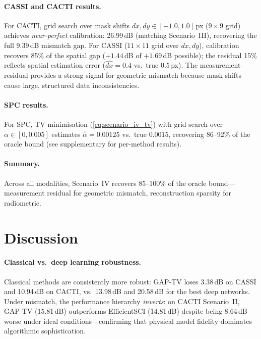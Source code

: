 \documentclass[runningheads]{llncs}
\begin{document}
\paragraph{CASSI and CACTI results.}
For CACTI, grid search over mask shifts $dx, dy \in [-1.0, 1.0]$\,px ($9 \times 9$ grid) achieves \emph{near-perfect} calibration: 26.99\,dB (matching Scenario~III), recovering the full 9.39\,dB mismatch gap.
For CASSI ($11 \times 11$ grid over $dx, dy$), calibration recovers 85\% of the spatial gap ($+1.44$\,dB of $+1.69$\,dB possible); the residual 15\% reflects spatial estimation error ($\hat{dx}{=}0.4$ vs.\ true $0.5$\,px).
The measurement residual provides a strong signal for geometric mismatch because mask shifts cause large, structured data inconsistencies.

\paragraph{SPC results.}
For SPC, TV minimisation (\cref{eq:scenario_iv_tv}) with grid search over $\alpha \in [0, 0.005]$ estimates $\hat{\alpha} = 0.00125$ vs.\ true $0.0015$, recovering 86--92\% of the oracle bound (see supplementary for per-method results).



\paragraph{Summary.}
Across all modalities, Scenario~IV recovers 85--100\% of the oracle bound---measurement residual for geometric mismatch, reconstruction sparsity for radiometric.

\section{Discussion}
\label{sec:discussion}

\paragraph{Classical vs.\ deep learning robustness.}
Classical methods are consistently more robust: GAP-TV loses 3.38\,dB on CASSI and 10.94\,dB on CACTI, vs.\ 13.98\,dB and 20.58\,dB for the best deep networks.
Under mismatch, the performance hierarchy \emph{inverts}: on CACTI Scenario~II, GAP-TV (15.81\,dB) outperforms EfficientSCI (14.81\,dB) despite being 8.64\,dB worse under ideal conditions---confirming that physical model fidelity dominates algorithmic sophistication.
\end{document}
